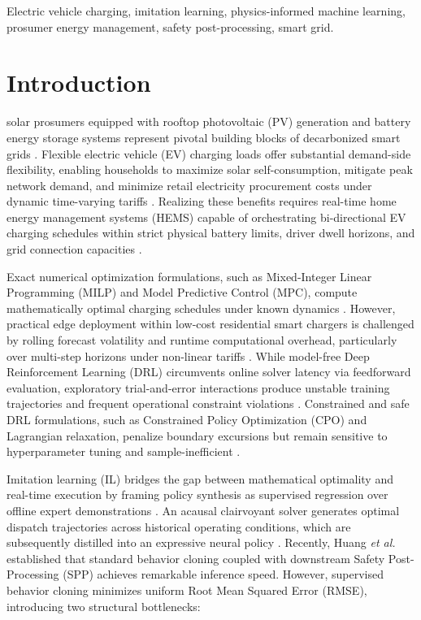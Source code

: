 \documentclass[journal]{IEEEtran}
\theoremstyle{remark}
\begin{document}
\begin{IEEEkeywords}
Electric vehicle charging, imitation learning, physics-informed machine learning, prosumer energy management, safety post-processing, smart grid.
\end{IEEEkeywords}

\section{Introduction}
 solar prosumers equipped with rooftop photovoltaic (PV) generation and battery energy storage systems represent pivotal building blocks of decarbonized smart grids \cite{fachrizal2024}. Flexible electric vehicle (EV) charging loads offer substantial demand-side flexibility, enabling households to maximize solar self-consumption, mitigate peak network demand, and minimize retail electricity procurement costs under dynamic time-varying tariffs \cite{richardson2012}. Realizing these benefits requires real-time home energy management systems (HEMS) capable of orchestrating bi-directional EV charging schedules within strict physical battery limits, driver dwell horizons, and grid connection capacities \cite{morstyn2018}.

Exact numerical optimization formulations, such as Mixed-Integer Linear Programming (MILP) and Model Predictive Control (MPC), compute mathematically optimal charging schedules under known dynamics \cite{franco2015, clement2010}. However, practical edge deployment within low-cost residential smart chargers is challenged by rolling forecast volatility and runtime computational overhead, particularly over multi-step horizons under non-linear tariffs \cite{shi2019, zheng2019}. While model-free Deep Reinforcement Learning (DRL) circumvents online solver latency via feedforward evaluation, exploratory trial-and-error interactions produce unstable training trajectories and frequent operational constraint violations \cite{wan2019, schulman2017}. Constrained and safe DRL formulations, such as Constrained Policy Optimization (CPO) and Lagrangian relaxation, penalize boundary excursions but remain sensitive to hyperparameter tuning and sample-inefficient \cite{yan2021, li2020, qiu2020}.

Imitation learning (IL) bridges the gap between mathematical optimality and real-time execution by framing policy synthesis as supervised regression over offline expert demonstrations \cite{ross2011, osa2018}. An acausal clairvoyant solver generates optimal dispatch trajectories across historical operating conditions, which are subsequently distilled into an expressive neural policy \cite{gao2022, dinh2022}. Recently, Huang \textit{et al.} \cite{huang2024} established that standard behavior cloning coupled with downstream Safety Post-Processing (SPP) achieves remarkable inference speed. However, supervised behavior cloning minimizes uniform Root Mean Squared Error (RMSE), introducing two structural bottlenecks:
\end{document}

